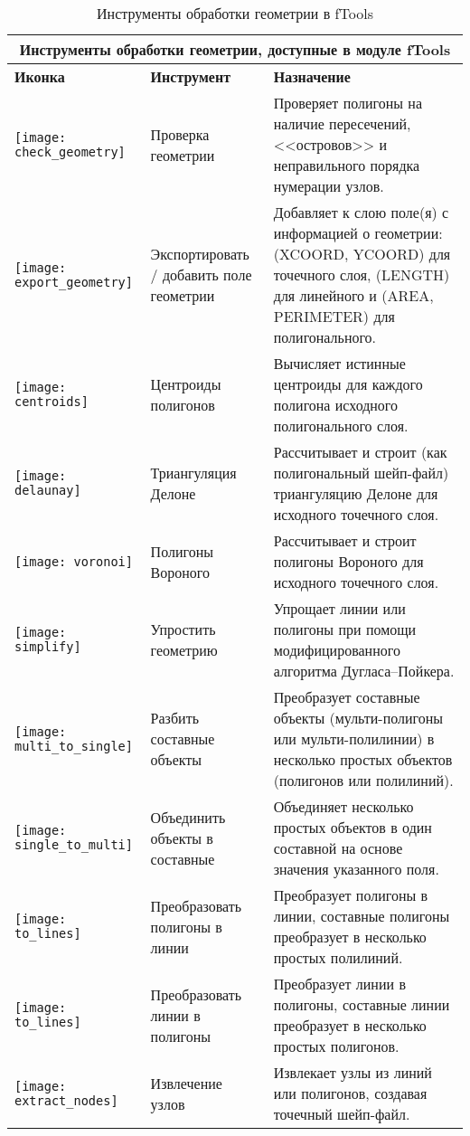\begin{table}[ht]
\centering
\begin{tabular}{|m{1cm}|m{4cm}|m{9cm}|}
 \hline \multicolumn{3}{|c|}{\textbf{Инструменты обработки геометрии, доступные в  модуле fTools}} \\
 \hline \textbf{Иконка} & \textbf{Инструмент} & \textbf{Назначение} \\
 \hline \texttt{[image: check\_geometry]} & Проверка геометрии &
 Проверяет полигоны на наличие пересечений, <<островов>> и неправильного порядка нумерации узлов. \\
 \hline \texttt{[image: export\_geometry]} & Экспортировать / добавить поле
 геометрии & Добавляет к слою поле(я) с информацией о геометрии: (XCOORD, YCOORD) для точечного
 слоя, (LENGTH) для линейного и (AREA, PERIMETER) для полигонального. \\
 \hline \texttt{[image: centroids]} & Центроиды полигонов &
 Вычисляет истинные центроиды для каждого полигона исходного полигонального слоя. \\
 \hline \texttt{[image: delaunay]} & Триангуляция Делоне &
 Рассчитывает и строит (как полигональный шейп-файл) триангуляцию Делоне для исходного точечного слоя. \\
 \hline \texttt{[image: voronoi]} & Полигоны Вороного & Рассчитывает и
 строит полигоны Вороного для исходного точечного слоя. \\
 \hline \texttt{[image: simplify]} & Упростить геометрию &
 Упрощает линии или полигоны при помощи модифицированного алгоритма Дугласа--Пойкера. \\
 \hline \texttt{[image: multi\_to\_single]} & Разбить составные
 объекты & Преобразует составные объекты (мульти-полигоны или мульти-полилинии)
 в несколько простых объектов (полигонов или полилиний). \\
 \hline \texttt{[image: single\_to\_multi]} & Объединить
 объекты в составные & Объединяет несколько простых объектов в один составной
 на основе значения указанного поля. \\
 \hline \texttt{[image: to\_lines]} & Преобразовать полигоны в линии
 & Преобразует полигоны в линии, составные полигоны преобразует в несколько простых полилиний. \\
 \hline \texttt{[image: to\_lines]} & Преобразовать линии в полигоны
 & Преобразует линии в полигоны, составные линии преобразует в несколько простых полигонов. \\
 \hline \texttt{[image: extract\_nodes]} & Извлечение узлов &
 Извлекает узлы из линий или полигонов, создавая точечный шейп-файл. \\
 \hline
\end{tabular}
\caption{Инструменты обработки геометрии в fTools}\label{tab:ftool_geometry}
\end{table}

